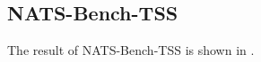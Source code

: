 \documentclass[sigconf]{acmart}
\begin{document}
    \subsection{NATS-Bench-TSS}
    The result of NATS-Bench-TSS is shown in .
\end{document}
